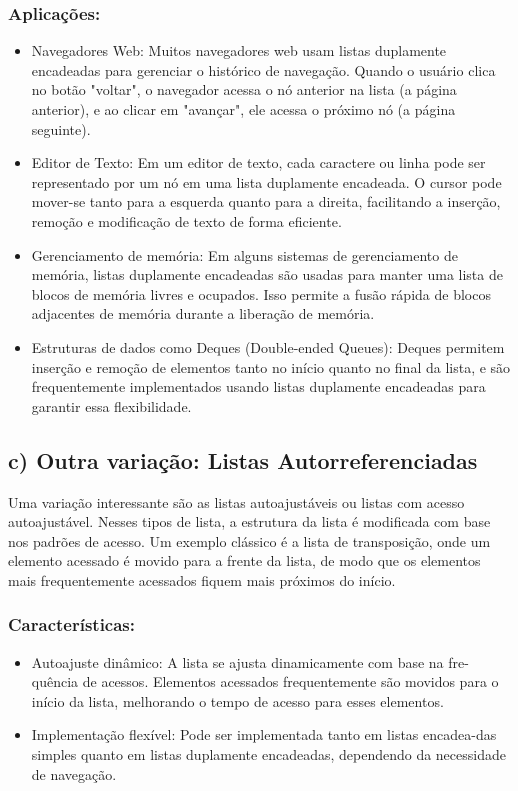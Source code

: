 \documentclass{article}
\begin{document}
\subsubsection{Aplicações:}
\begin{itemize}
    \item Navegadores Web: Muitos navegadores web usam listas duplamente encadeadas para gerenciar o histórico de navegação. Quando o usuário clica no botão "voltar", o navegador acessa o nó anterior na lista (a página anterior), e ao clicar em "avançar", ele acessa o próximo nó (a página seguinte).

    \item Editor de Texto: Em um editor de texto, cada caractere ou linha pode ser representado por um nó em uma lista duplamente encadeada. O cursor pode mover-se tanto para a esquerda quanto para a direita, facilitando a inserção, remoção e modificação de texto de forma eficiente.
    
    \item Gerenciamento de memória: Em alguns sistemas de gerenciamento de memória, listas duplamente encadeadas são usadas para manter uma lista de blocos de memória livres e ocupados. Isso permite a fusão rápida de blocos adjacentes de memória durante a liberação de memória.
    
    \item Estruturas de dados como Deques (Double-ended Queues): Deques permitem inserção e remoção de elementos tanto no início quanto no final da lista, e são frequentemente implementados usando listas duplamente encadeadas para garantir essa flexibilidade.
\end{itemize}

\subsection*{c) Outra variação: Listas Autorreferenciadas}

Uma variação interessante são as listas autoajustáveis ou listas com acesso autoajustável. Nesses tipos de lista, a estrutura da lista é modificada com base nos padrões de acesso. Um exemplo clássico é a lista de transposição, onde um elemento acessado é movido para a frente da lista, de modo que os elementos mais frequentemente acessados fiquem mais próximos do início.

\subsubsection{Características:}
\begin{itemize}
    \item Autoajuste dinâmico: A lista se ajusta dinamicamente com base 
    na fre-quência de acessos. Elementos acessados frequentemente são 
    movidos para o início da lista, melhorando o tempo de acesso para 
    esses elementos.
    \item Implementação flexível: Pode ser implementada tanto em listas 
    encadea-das simples quanto em listas duplamente encadeadas, 
    dependendo da necessidade de navegação.
\end{itemize}
\end{document}
